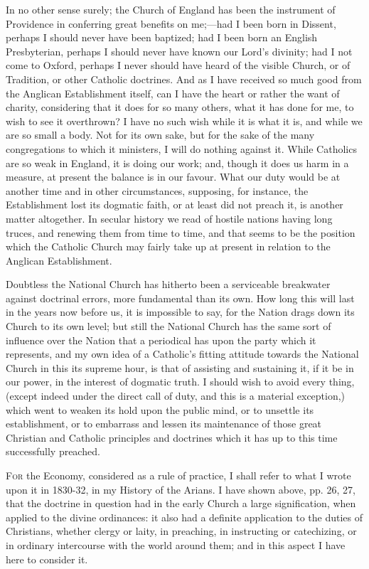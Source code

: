 In no other sense surely; the Church of England has been the
instrument of Providence in conferring great benefits on me;—had
I been born in Dissent, perhaps I should never have been baptized; had I
been born an English Presbyterian, perhaps I should never have known our
Lord's divinity; had I not come to Oxford, perhaps I never should have
heard of the visible Church, or of Tradition, or other Catholic
doctrines. And as I have received so much good from the Anglican
Establishment itself, can I have the heart or rather the want of
charity, considering that it does for so many others, what it has done for me, to wish to see it overthrown? I have no such wish while it
is what it is, and while we are so small a body. Not for its own sake,
but for the sake of the many congregations to which it ministers, I will
do nothing against it. While Catholics are so weak in England, it is
doing our work; and, though it does us harm in a measure, at present the
balance is in our favour. What our duty would be at another time and in
other circumstances, supposing, for instance, the Establishment lost its
dogmatic faith, or at least did not preach it, is another matter
altogether. In secular history we read of hostile nations having long
truces, and renewing them from time to time, and that seems to be the
position which the Catholic Church may fairly take up at present
in relation to the Anglican Establishment.

Doubtless the National Church has hitherto been a serviceable
breakwater against doctrinal errors, more fundamental than its own. How
long this will last in the years now before us, it is impossible to say,
for the Nation drags down its Church to its own level; but still the
National Church has the same sort of influence over the Nation that a
periodical has upon the party which it represents, and my own idea of a
Catholic's fitting attitude towards the National Church in this its
supreme hour, is that of assisting and sustaining it, if it be in our
power, in the interest of dogmatic truth. I should wish to avoid every
thing, (except indeed under the direct call of duty, and this is a material
exception,) which went to weaken its hold upon the public mind, or
to unsettle its establishment, or to embarrass and lessen its
maintenance of those great Christian and Catholic principles and
doctrines which it has up to this time successfully preached.


F\textsc{or} the Economy, considered as a rule of practice, I shall refer
to what I wrote upon it in 1830-32, in my History of the
Arians. I have shown
above, pp. 26, 27, that the doctrine in question had in the early Church a large signification, when applied to the
divine ordinances: it also had a definite application to the duties of
Christians, whether clergy or laity, in preaching, in instructing or
catechizing, or in ordinary intercourse with the world around them;
and in this aspect I have here to consider it.

